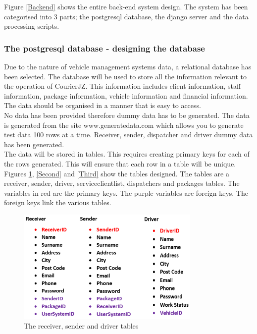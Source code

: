 \documentclass[paper=a4, fontsize=11pt]{scrartcl} %
\numberwithin{equation}{section} %
\numberwithin{figure}{section} %
\numberwithin{table}{section} %
\begin{document}
Figure \ref{Backend} shows the entire back-end system design. The system has been categorised into 3 parts; the postgresql database, the django server and the data processing scripts. 

\subsubsection {The postgresql database - designing the database}
Due to the nature of vehicle management systems data, a relational database has been selected. The database will be used to store all the information relevant to the operation of CourierJZ. This information includes client information, staff information, package information, vehicle information and financial information. The data should be organised in a manner that is easy to access. 
\\

No data has been provided therefore dummy data has to be generated. The data is generated from the site www.generatedata.com which allows you to generate test data 100 rows at a time. Receiver, sender, dispatcher and driver dummy data has been generated.
\\

The data will be stored in tables. This requires creating primary keys for each of the rows generated. This will ensure that each row in a table will be unique. Figures \ref{First}, \ref{Second} and \ref{Third} show the tables designed. The tables are a receiver, sender, driver, serviceclientlist, dispatchers and packages tables. The variables in red are the primary keys. The purple variables are foreign keys. The foreign keys link the various tables. 
\\ 

\begin{figure}[hbt!]
\centering
\includegraphics[width=3.5in]{pictures/db/first3.png}
\caption{The receiver, sender and driver tables}
\label{First}
\end{figure}
\end{document}
